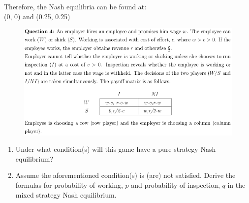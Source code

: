 \documentclass[12pt]{article}
\newenvironment{solution}[2][Solution]{\begin{trivlist}
\item[\hskip \labelsep {\bfseries #1}]}{\end{trivlist}}
\begin{document}
\begin{solution}{}
\begin{enumerate}[label=\alph*)]
Therefore, the Nash equilibria can be found at:\\

(0, 0) and (0.25, 0.25)

\end{enumerate}
\end{solution}

\begin{figure}[h!]
\includegraphics[width=\linewidth]{./assets/201805201650.png}
\end{figure}

\begin{enumerate}[label=\alph*)]
\item Under what condition(s) will this game have a pure strategy Nash equilibrium?
\item Assume the aforementioned condition(s) is (are) not satisfied.  Derive the formulas for
probability of working, $p$ and probability of inspection, $q$ in the mixed strategy Nash equilibrium.
\end{enumerate}
\end{document}

